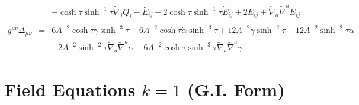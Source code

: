 \documentclass[10pt,letterpaper]{article}
\numberwithin{equation}{section}
\begin{document}
\begin{eqnarray}
&& + \cosh\tau \sinh^{-1}\tau \tilde{\nabla}_{j}Q_{i}- \overset{..}{E}_{ij} - 2 \cosh\tau \sinh^{-1}\tau \dot{E}_{ij} + 2 E_{ij} + \tilde{\nabla}_{a}\tilde{\nabla}^{a}E_{ij}
\\  \nonumber\\ 
g^{\mu\nu}\Delta_{\mu\nu}&=& 6 A^{-2} \cosh\tau \overset{..}{\gamma} \sinh^{-3}\tau - 6 A^{-2} \cosh\tau \dot{\alpha} \sinh^{-3}\tau + 12 A^{-2} \dot{\gamma} \sinh^{-2}\tau - 12 A^{-2} \sinh^{-2}\tau \alpha \nonumber \\ 
&& - 2 A^{-2} \sinh^{-2}\tau \tilde{\nabla}_{a}\tilde{\nabla}^{a}\alpha - 6 A^{-2} \cosh\tau \sinh^{-3}\tau \tilde{\nabla}_{a}\tilde{\nabla}^{a}\gamma 
\end{eqnarray}

\section{Field Equations $k=1$ (G.I. Form)}
\end{document}
